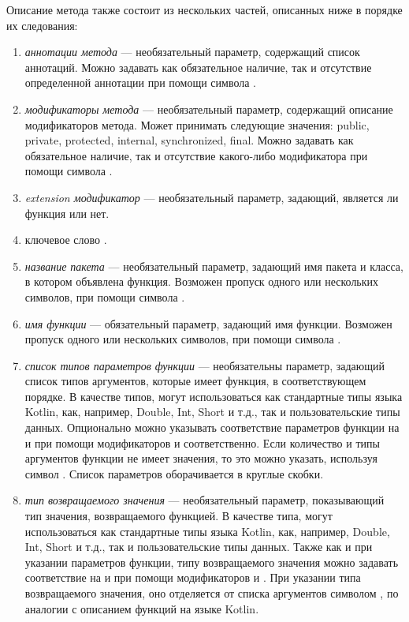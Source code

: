 Описание метода также состоит из нескольких частей, описанных ниже в порядке их
следования:
\begin{enumerate}
	\item \textit{аннотации метода} --- необязательный параметр, содержащий
		  список аннотаций.
		  Можно задавать как обязательное наличие, так и отсутствие определенной
		  аннотации при помощи символа \quotes{!}.
	\item \textit{модификаторы метода} --- необязательный параметр, содержащий
		  описание модификаторов метода.
		  Может принимать следующие значения: public, private, protected,
		  internal, synchronized, final.
		  Можно задавать как обязательное наличие, так и отсутствие какого-либо
		  модификатора при помощи символа \quotes{!}.
	\item \textit{extension модификатор} --- необязательный параметр, задающий,
		  является ли функция  или нет.
	\item ключевое слово .
	\item \textit{название пакета} --- необязательный параметр, задающий имя
		  пакета и класса, в котором объявлена функция.
		  Возможен пропуск одного или нескольких символов, при помощи символа
		  \quotes{*}.
	\item \textit{имя функции} --- обязательный параметр, задающий имя функции.
		  Возможен пропуск одного или нескольких символов, при помощи символа
		  \quotes{*}.
	\item \textit{список типов параметров функции} --- необязательны параметр,
		  задающий список типов аргументов, которые имеет функция, в
		  соответствующем порядке.
		  В качестве типов, могут использоваться как стандартные типы языка
		  Kotlin, как, например, Double, Int, Short и т.д., так и
		  пользовательские типы данных.
		  Опционально можно указывать соответствие параметров функции на
		   и  при помощи модификаторов
		  \quotes{!!} и  соответственно.
		  Если количество и типы аргументов функции не имеет значения, то это
		  можно указать, используя символ .
		  Список параметров оборачивается в круглые скобки.
	\item \textit{тип возвращаемого значения} --- необязательный параметр,
		  показывающий тип значения, возвращаемого функцией.
		  В качестве типа, могут использоваться как стандартные типы языка
		  Kotlin, как, например, Double, Int, Short и т.д., так и
		  пользовательские типы данных.
		  Также как и при указании параметров функции, типу возвращаемого
		  значения можно задавать соответствие на  и
		   при помощи модификаторов \quotes{!!} и .
		  При указании типа возвращаемого значения, оно отделяется от списка
		  аргументов символом \quotes{:}, по аналогии с описанием функций на
		  языке Kotlin.
\end{enumerate}

